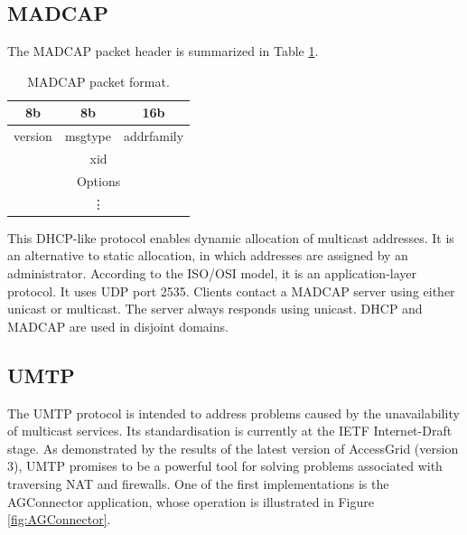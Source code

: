 \subsection{MADCAP}

The MADCAP packet header is summarized in Table \ref{tab:MADCAP-packet-format}.
\begin{table}[htp]
\centering
\begin{tabular}[t]{|c|c|c|}
8b & 8b & 16b \\
\hline	version & msgtype & addrfamily \\
\hline	\multicolumn{3}{|c|}{xid} \\
\hline	\multicolumn{3}{|c|}{Options} \\
		\multicolumn{3}{|c|}{\vdots} \\
\hline
\end{tabular}
\caption{MADCAP packet format.}
\label{tab:MADCAP-packet-format}
\end{table}

This DHCP-like protocol enables dynamic allocation of multicast addresses. It is an alternative to static allocation, in which addresses are assigned by an administrator. According to the ISO/OSI model, it is an application-layer protocol. It uses UDP port 2535. Clients contact a MADCAP server using either unicast or multicast. The server always responds using unicast. DHCP and MADCAP are used in disjoint domains.

\subsection{UMTP}\label{kap:UMTP}
The UMTP protocol \cite{IETFDraft-UMTP} is intended to address problems caused by the unavailability of multicast services. Its standardisation is currently at the IETF Internet-Draft stage. As demonstrated by the results of the latest version of AccessGrid (version 3), UMTP promises to be a powerful tool for solving problems associated with traversing NAT and firewalls. One of the first implementations is the AGConnector application, whose operation is illustrated in Figure \ref{fig:AGConnector}.

